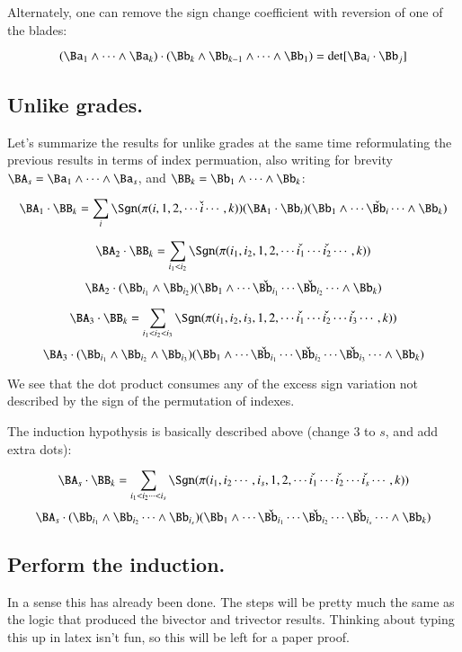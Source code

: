 Alternately, one can remove the sign change coefficient with reversion of one of the blades:

\begin{equation}\label{eqn:bladegradereduction:bladedothyprev}
(\Ba_1 \wedge \cdots \wedge \Ba_k) \cdot (\Bb_k \wedge \Bb_{k-1} \wedge \cdots \wedge \Bb_1) = \det[\Ba_i \cdot \Bb_j]
\end{equation}

\subsection{Unlike grades. }

Let's summarize the results for unlike grades at the same time reformulating the previous results in terms of index
permuation, also writing for brevity $\BA_s = \Ba_1 \wedge \cdots \wedge \Ba_s$, and $\BB_k = \Bb_1 \wedge \cdots \wedge \Bb_k$:

\[
\BA_1 \cdot \BB_k =
\sum_i \Sgn(\pi(i,1,2,\cdots\check{i}\cdots,k)) (\BA_1 \cdot \Bb_i) (\Bb_1 \wedge \cdots \check{\Bb_i} \cdots \wedge \Bb_k) 
\]

\[
\BA_2 \cdot \BB_k =
\sum_{i_1<i_2} \Sgn(\pi(i_1,i_2,1,2,\cdots\check{i_1}\cdots\check{i_2}\cdots,k)) 
\]
\[
   \BA_2 \cdot (\Bb_{i_1} \wedge \Bb_{i_2})
   (\Bb_1 \wedge \cdots \check{\Bb_{i_1}} \cdots \check{\Bb_{i_2}} \cdots \wedge \Bb_k)
\]

\[
\BA_3 \cdot \BB_k =
\sum_{i_1<i_2<i_3} \Sgn(\pi(i_1,i_2,i_3,1,2,\cdots\check{i_1}\cdots\check{i_2}\cdots\check{i_3}\cdots,k)) 
\]
\[
\BA_3 \cdot (\Bb_{i_1} \wedge \Bb_{i_2} \wedge \Bb_{i_3})
(\Bb_1 \wedge \cdots \check{\Bb_{i_1}} \cdots \check{\Bb_{i_2}} \cdots \check{\Bb_{i_3}} \cdots \wedge \Bb_k) 
\]

We see that the dot product consumes any of the excess sign variation not described by the sign of the permutation of indexes.

The induction hypothysis is basically described above (change $3$ to $s$, and add extra dots):

\begin{equation*}
\BA_s \cdot \BB_k =
\sum_{i_1<i_2\cdots<i_s} \Sgn(\pi(i_1,i_2\cdots,i_s,1,2,\cdots\check{i_1}\cdots\check{i_2}\cdots\check{i_s}\cdots,k)) 
\end{equation*}
\begin{equation}\label{eqn:bladegradereduction:inductionbigdotblade}
\BA_s \cdot (\Bb_{i_1} \wedge \Bb_{i_2} \cdots \wedge \Bb_{i_s})
(\Bb_1 \wedge \cdots \check{\Bb_{i_1}} \cdots \check{\Bb_{i_2}} \cdots \check{\Bb_{i_s}} \cdots \wedge \Bb_k) 
\end{equation}

\subsection{Perform the induction. }

In a sense this has already been done.  The steps will be pretty much the same as the logic that produced the bivector and trivector 
results.  Thinking about typing this up in latex isn't fun, so this will be left for a paper proof.
